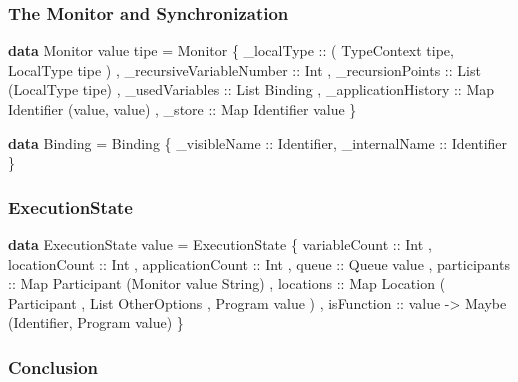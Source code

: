 \documentclass[12pt]{beamer}
\newenvironment{Shaded}{}{}
\newcommand{\KeywordTok}[1]{\textcolor[rgb]{0.00,0.44,0.13}{\textbf{#1}}}
\newcommand{\DataTypeTok}[1]{\textcolor[rgb]{0.56,0.13,0.00}{#1}}
\newcommand{\OtherTok}[1]{\textcolor[rgb]{0.00,0.44,0.13}{#1}}
\newcommand{\FunctionTok}[1]{\textcolor[rgb]{0.02,0.16,0.49}{#1}}
\newcommand{\NormalTok}[1]{#1}
\begin{document}
\begin{frame}[fragile]
\frametitle{The Monitor and Synchronization}


\begin{Shaded}
\begin{Highlighting}[]
\KeywordTok{data} \DataTypeTok{Monitor}\NormalTok{ value tipe }\FunctionTok{=} 
    \DataTypeTok{Monitor} 
\NormalTok{        \{}\OtherTok{ \_localType ::} \NormalTok{( }\DataTypeTok{TypeContext}\NormalTok{ tipe,}\DataTypeTok{ LocalType}\NormalTok{ tipe )}
\NormalTok{        ,}\OtherTok{ \_recursiveVariableNumber ::} \DataTypeTok{Int}
\NormalTok{        ,}\OtherTok{ \_recursionPoints ::} \DataTypeTok{List}\NormalTok{ (}\DataTypeTok{LocalType}\NormalTok{ tipe)}
\NormalTok{        ,}\OtherTok{ \_usedVariables ::} \DataTypeTok{List} \DataTypeTok{Binding} 
\NormalTok{        ,}\OtherTok{ \_applicationHistory ::} \DataTypeTok{Map} \DataTypeTok{Identifier}\NormalTok{ (value, value)}
\NormalTok{        ,}\OtherTok{ \_store ::} \DataTypeTok{Map} \DataTypeTok{Identifier}\NormalTok{ value }
\NormalTok{        \}}

\KeywordTok{data} \DataTypeTok{Binding} \FunctionTok{=} 
    \DataTypeTok{Binding}\NormalTok{ \{}\OtherTok{ \_visibleName ::} \DataTypeTok{Identifier}\NormalTok{,}\OtherTok{ _internalName ::} \DataTypeTok{Identifier}\NormalTok{ \} }
\end{Highlighting}
\end{Shaded}

\end{frame}




\begin{frame}[fragile]
\frametitle{ExecutionState}

\begin{Shaded}
\begin{Highlighting}[]
\KeywordTok{data} \DataTypeTok{ExecutionState}\NormalTok{ value }\FunctionTok{=} 
    \DataTypeTok{ExecutionState} 
\NormalTok{        \{}\OtherTok{ variableCount ::} \DataTypeTok{Int}
\NormalTok{        ,}\OtherTok{ locationCount ::} \DataTypeTok{Int}
\NormalTok{        ,}\OtherTok{ applicationCount ::} \DataTypeTok{Int}
\NormalTok{        ,}\OtherTok{ queue ::} \DataTypeTok{Queue}\NormalTok{ value}
\NormalTok{        ,}\OtherTok{ participants ::} \DataTypeTok{Map} \DataTypeTok{Participant}\NormalTok{ (}\DataTypeTok{Monitor}\NormalTok{ value }\DataTypeTok{String}\NormalTok{)}
\NormalTok{        ,}\OtherTok{ locations ::} \DataTypeTok{Map} \DataTypeTok{Location}
                \NormalTok{( }\DataTypeTok{Participant}
                \NormalTok{, }\DataTypeTok{List} \DataTypeTok{OtherOptions}
                \NormalTok{, }\DataTypeTok{Program}\NormalTok{ value}
                \NormalTok{) }
\NormalTok{        ,}\OtherTok{ isFunction ::}\NormalTok{ value }\OtherTok{->} \DataTypeTok{Maybe}\NormalTok{ (}\DataTypeTok{Identifier}\NormalTok{, }\DataTypeTok{Program}\NormalTok{ value)}
\NormalTok{        \}}
\end{Highlighting}
\end{Shaded}

\end{frame}


\begin{frame}[fragile]
\frametitle{Conclusion}
\end{frame}
\end{document}

